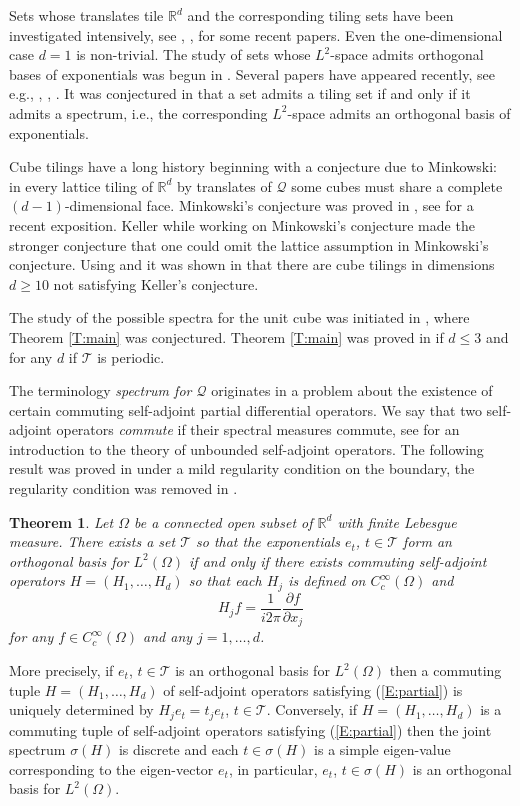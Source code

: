 \documentclass[12pt]{amsart}
\theoremstyle{plain}
\newtheorem{theorem}{Theorem}[section]
\numberwithin{equation}{section}
\newcommand{\Q}{\ensuremath{\mathcal{Q}}\xspace}
\newcommand{\T}{\ensuremath{\mathcal{T}}\xspace}
\newcommand{\Rd}{\ensuremath{\mathbb{R}^{d}}\xspace}
\begin{document}
Sets whose translates tile \Rd and the corresponding tiling sets
have been investigated intensively, see \cite{GN}, \cite{LaWa1},
\cite{LaWa2} for some recent papers.
Even the one-dimensional case $d=1$ is
non-trivial. The study of sets whose $L^2$-space admits orthogonal
bases of exponentials was begun in \cite{Fu}. Several papers have
appeared recently, see e.g.,
\cite{JP1}, \cite{Pede}, \cite{LaWa3}.
It was conjectured in \cite{Fu} that a set admits a tiling set if
and only if it admits a spectrum, i.e., the corresponding $L^2$-space
admits an orthogonal basis of exponentials.

Cube tilings have a long history beginning with a conjecture due to
Minkowski: in every lattice tiling of \Rd by translates of \Q some
cubes must share a complete $(d-1)$-dimensional face.
Minkowski's conjecture was proved in \cite{Haj1}, see \cite{SS} for a
recent exposition. Keller \cite{Kel1}
while working on Minkowski's conjecture made the stronger conjecture
that one could omit the lattice assumption in Minkowski's conjecture.
Using \cite{Sza} and \cite{CoSz} it was shown in \cite{LaSh}
that there are
cube tilings in dimensions $d\geq 10$ not satisfying Keller's
conjecture.

The study of the possible spectra for the unit cube was initiated in
\cite{JP2}, where Theorem \ref{T:main} was conjectured.
Theorem \ref{T:main} was proved in \cite{JP2} if $d\leq 3$
and for any $d$ if \T is periodic.

The terminology \emph{spectrum for \Q} originates in a problem about
the existence of certain commuting self-adjoint partial differential
operators.
We say that two self-adjoint operators \emph{commute} if their
spectral measures commute, see \cite{RS} for an introduction to
the theory of unbounded self-adjoint operators. The following result
was proved in \cite{Fu} under a mild regularity condition on the
boundary, the regularity condition was removed in \cite{Ped1}.
\begin{theorem}
   Let $\Omega$ be a connected open subset of \Rd with
   finite Lebesgue measure.
   There exists a set \T so that the exponentials $e_t$, $t\in\T$
   form an orthogonal basis for $L^2(\Omega)$ if and only if there
   exists commuting self-adjoint operators
   $H=(H_1,\ldots,H_d)$ so that each
   $H_j$ is defined on $C^{\infty}_c(\Omega)$ and
   \begin{equation}\label{E:partial}
      H_j f= \frac{1}{i2\pi}\frac{\partial f}{\partial x_j}
   \end{equation}
   for any $f\in C^{\infty}_c(\Omega)$ and any $j=1,\ldots,d$.
\end{theorem}
More precisely, if $e_t$, $t\in\T$ is an orthogonal basis for
$L^2(\Omega)$ then a commuting tuple $H=(H_1,\ldots,H_d)$ of
self-adjoint operators satisfying (\ref{E:partial}) is uniquely
determined by $H_j e_t = t_j e_t$, $t\in\T$. Conversely, if
$H=(H_1,\ldots,H_d)$ is a commuting tuple of self-adjoint operators
satisfying (\ref{E:partial}) then the joint spectrum $\sigma(H)$ is
discrete and each $t\in\sigma(H)$ is a simple
eigen-value corresponding
to the eigen-vector $e_t$, in particular, $e_t$, $t\in\sigma(H)$
is an orthogonal basis for $L^2(\Omega)$.
\end{document}
